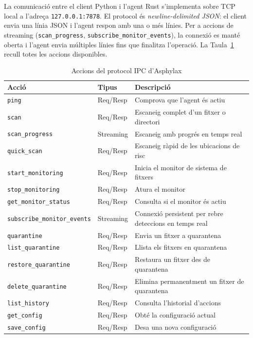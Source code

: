 \documentclass[12pt,a4paper]{report}
\begin{document}
La comunicació entre el client Python i l'agent Rust s'implementa sobre TCP local a l'adreça \texttt{127.0.0.1:7878}. El protocol és \textit{newline-delimited JSON}: el client envia una línia JSON i l'agent respon amb una o més línies. Per a accions de streaming (\texttt{scan\_progress}, \texttt{subscribe\_monitor\_events}), la connexió es manté oberta i l'agent envia múltiples línies fins que finalitza l'operació. La Taula~\ref{tab:accions_ipc} recull totes les accions disponibles.

\begin{table}[H]
\centering
\caption{Accions del protocol IPC d'Asphylax}
\label{tab:accions_ipc}
\begin{tabular}{@{}llp{6.5cm}@{}}
\toprule
\textbf{Acció} & \textbf{Tipus} & \textbf{Descripció} \\
\midrule
\texttt{ping} & Req/Resp & Comprova que l'agent és actiu \\
\texttt{scan} & Req/Resp & Escaneig complet d'un fitxer o directori \\
\texttt{scan\_progress} & Streaming & Escaneig amb progrés en temps real \\
\texttt{quick\_scan} & Req/Resp & Escaneig ràpid de les ubicacions de risc \\
\texttt{start\_monitoring} & Req/Resp & Inicia el monitor de sistema de fitxers \\
\texttt{stop\_monitoring} & Req/Resp & Atura el monitor \\
\texttt{get\_monitor\_status} & Req/Resp & Consulta si el monitor és actiu \\
\texttt{subscribe\_monitor\_events} & Streaming & Connexió persistent per rebre deteccions en temps real \\
\texttt{quarantine} & Req/Resp & Envia un fitxer a quarantena \\
\texttt{list\_quarantine} & Req/Resp & Llista els fitxers en quarantena \\
\texttt{restore\_quarantine} & Req/Resp & Restaura un fitxer des de quarantena \\
\texttt{delete\_quarantine} & Req/Resp & Elimina permanentment un fitxer de quarantena \\
\texttt{list\_history} & Req/Resp & Consulta l'historial d'accions \\
\texttt{get\_config} & Req/Resp & Obté la configuració actual \\
\texttt{save\_config} & Req/Resp & Desa una nova configuració \\
\bottomrule
\end{tabular}
\end{table}
\end{document}
